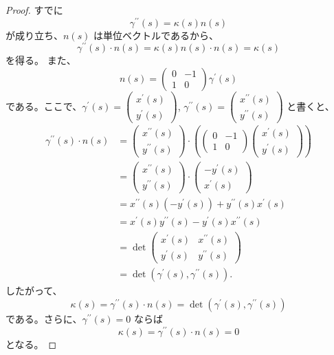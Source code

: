 \documentclass[article,paper=a4paper]{jlreq}
\begin{document}
\begin{proof}
    すでに
    \[
        \gamma^{\prime\prime}(s) = \kappa(s)n(s)
    \]
    が成り立ち、$n(s)$ は単位ベクトルであるから、
    \[
        \gamma^{\prime\prime}(s) \cdot n(s) = \kappa(s) n(s) \cdot n(s) = \kappa(s)
    \]
    を得る。
    また、
    \[
        n(s) =
        \begin{pmatrix}
            0 & -1\\
            1 & 0
        \end{pmatrix}\gamma^{\prime}(s)
    \]
    である。ここで、$\gamma^{\prime}(s) = \begin{pmatrix}x^{\prime}(s)\\ y^{\prime}(s)\end{pmatrix}$,
    $\gamma^{\prime\prime}(s) = \begin{pmatrix}x^{\prime\prime}(s)\\ y^{\prime\prime}(s)\end{pmatrix}$ と書くと、
    \begin{align*}
        \gamma^{\prime\prime}(s) \cdot n(s)
        &= \begin{pmatrix}
        x^{\prime\prime}(s)\\
        y^{\prime\prime}(s)
        \end{pmatrix}
        \cdot
        \left(
        \begin{pmatrix}
        0 & -1\\
        1 & 0
        \end{pmatrix}
        \begin{pmatrix}
        x^{\prime}(s)\\
        y^{\prime}(s)
        \end{pmatrix}
        \right) \\
        &= \begin{pmatrix}
        x^{\prime\prime}(s)\\
        y^{\prime\prime}(s)
        \end{pmatrix}
        \cdot
        \begin{pmatrix}
        -y^{\prime}(s)\\
        x^{\prime}(s)
        \end{pmatrix} \\
        &= x^{\prime\prime}(s)(-y^{\prime}(s)) + y^{\prime\prime}(s)x^{\prime}(s) \\
        &= x^{\prime}(s)y^{\prime\prime}(s) - y^{\prime}(s)x^{\prime\prime}(s) \\
        &= \det\begin{pmatrix}
        x^{\prime}(s) & x^{\prime\prime}(s)\\
        y^{\prime}(s) & y^{\prime\prime}(s)
        \end{pmatrix} \\
        &= \det(\gamma^{\prime}(s), \gamma^{\prime\prime}(s)).
    \end{align*}
    したがって、
    \[
        \kappa(s) = \gamma^{\prime\prime}(s) \cdot n(s) = \det(\gamma^{\prime}(s), \gamma^{\prime\prime}(s))
    \]
    である。さらに、$\gamma^{\prime\prime}(s) = 0$ ならば
    \[
        \kappa(s) = \gamma^{\prime\prime}(s) \cdot n(s) = 0
    \]
    となる。
\end{proof}
\end{document}
